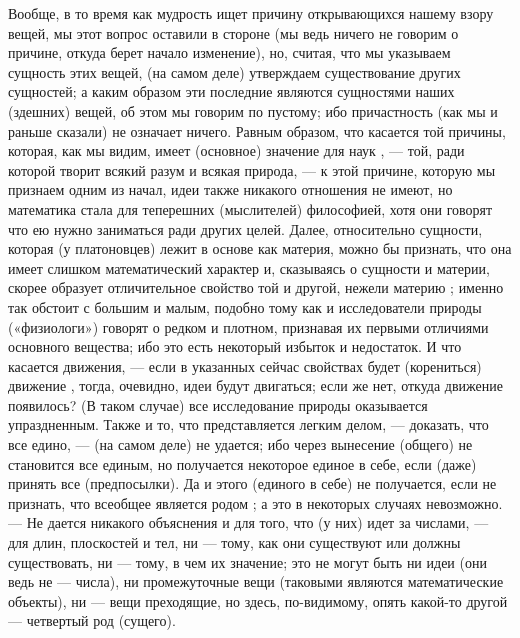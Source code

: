 \documentclass{article}
\begin{document}
Вообще, в то время как мудрость ищет причину открывающихся нашему взору вещей, мы
\footnotemark[44]
этот вопрос оставили в стороне (мы ведь ничего не говорим о причине, откуда берет начало изменение), но, считая, что мы указываем сущность этих вещей, (на самом деле) утверждаем существование других сущностей; а каким образом эти последние являются сущностями наших (здешних) вещей, об этом мы говорим по пустому; ибо причастность (как мы и раньше сказали) не означает ничего. Равным образом, что касается той причины, которая, как мы видим, имеет (основное) значение для наук
\footnotemark[45]
, — той, ради которой творит всякий разум и всякая природа, — к этой причине, которую мы признаем одним из начал, идеи также никакого отношения не имеют, но математика стала для теперешних (мыслителей) философией, хотя они говорят что ею нужно заниматься ради других целей. Далее, относительно сущности, которая (у платоновцев) лежит в основе как материя, можно бы признать, что она имеет слишком математический
\footnotemark[46]
характер и, сказываясь о сущности и материи, скорее образует отличительное свойство той и другой, нежели материю
\footnotemark[47]
; именно так обстоит с большим и малым, подобно тому как и исследователи природы («физиологи») говорят о редком и плотном, признавая их первыми отличиями основного вещества; ибо это есть некоторый избыток и недостаток.
\footnotemark[48]
И что касается движения, — если в указанных сейчас свойствах будет (корениться) движение
\footnotemark[49]
, тогда, очевидно, идеи будут двигаться; если же нет, откуда движение появилось? (В таком случае) все исследование природы оказывается упраздненным. Также и то, что представляется легким делом, — доказать, что все едино, — (на самом деле) не удается; ибо через вынесение (общего) не становится все единым, но получается некоторое единое в себе, если (даже) принять все (предпосылки).
\footnotemark[50]
Да и этого (единого в себе) не получается, если не признать, что всеобщее является родом
\footnotemark[51]
; а это в некоторых случаях невозможно. — Не дается никакого объяснения и для того, что (у них) идет за числами, — для длин, плоскостей и тел, ни — тому, как они существуют или должны существовать, ни — тому, в чем их значение; это не могут быть ни идеи (они ведь не — числа), ни промежуточные вещи (таковыми являются математические объекты), ни — вещи преходящие, но здесь, по-видимому, опять какой-то другой — четвертый род (сущего).
\end{document}
